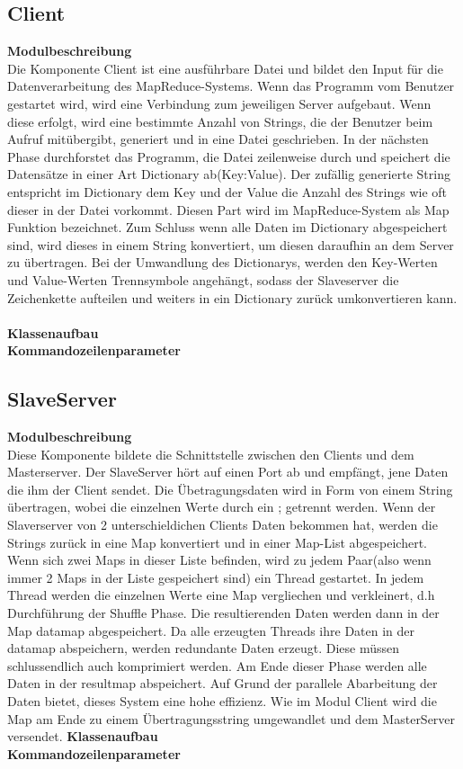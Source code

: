 \documentclass[a4paper,12pt]{article}
\begin{document}
\subsection{Client}
\textbf{Modulbeschreibung}\\
Die Komponente Client ist eine ausführbare Datei und bildet den Input für die Datenverarbeitung des MapReduce-Systems. Wenn das Programm vom Benutzer gestartet wird, wird eine Verbindung zum jeweiligen Server aufgebaut. Wenn diese erfolgt, wird eine bestimmte Anzahl von Strings, 
die der Benutzer beim Aufruf mitübergibt, generiert und in eine Datei geschrieben. In der nächsten Phase durchforstet das Programm, die Datei zeilenweise durch und speichert die Datensätze in einer Art Dictionary ab(Key:Value). Der zufällig generierte String entspricht im Dictionary dem Key und der Value die Anzahl des Strings wie oft dieser in der Datei vorkommt.
Diesen Part wird im MapReduce-System als Map Funktion bezeichnet. Zum Schluss wenn alle Daten im Dictionary abgespeichert sind, wird dieses in einem
String konvertiert, um diesen daraufhin an dem Server zu übertragen. Bei der Umwandlung des Dictionarys, werden den Key-Werten und Value-Werten Trennsymbole angehängt, sodass der Slaveserver die Zeichenkette aufteilen und weiters in ein Dictionary zurück umkonvertieren kann.\\\\
\textbf{Klassenaufbau}\\
\textbf{Kommandozeilenparameter}\\
\subsection{SlaveServer}
\textbf{Modulbeschreibung}\\
Diese Komponente bildete die Schnittstelle zwischen den Clients und dem Masterserver. Der SlaveServer hört auf einen Port ab und empfängt, jene Daten die ihm der Client sendet. Die Übetragungsdaten wird in Form von einem String übertragen, wobei die 
einzelnen Werte durch ein ; getrennt werden. Wenn der Slaverserver von 2 unterschieldichen Clients Daten bekommen hat, werden die Strings zurück in eine Map konvertiert und in einer Map-List abgespeichert. Wenn sich zwei Maps in dieser Liste befinden, wird zu jedem Paar(also wenn immer 2 Maps in der Liste gespeichert sind)
ein Thread gestartet. In jedem Thread werden die einzelnen Werte eine Map vergliechen und verkleinert, d.h Durchführung der Shuffle Phase. Die resultierenden Daten werden dann in der Map datamap abgespeichert. Da alle erzeugten Threads ihre Daten in der datamap abspeichern, werden redundante Daten erzeugt. Diese müssen schlussendlich auch komprimiert werden. Am Ende dieser Phase werden alle Daten in der resultmap abspeichert. 
Auf Grund der parallele Abarbeitung der Daten bietet, dieses System eine hohe effizienz. Wie im Modul Client wird die Map am Ende zu einem Übertragungsstring umgewandlet und dem MasterServer versendet.
\textbf{Klassenaufbau}\\
\textbf{Kommandozeilenparameter}\\
\end{document}
